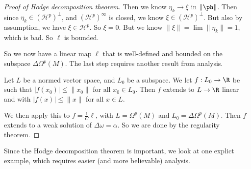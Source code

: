 \documentclass[a4paper]{article}
\begin{document}
\begin{proof}[Proof of Hodge decomposition theorem]
  Then we know $\eta_k\to \xi$ in $\| \ph\|$. Then since $\eta_k \in (\mathcal{H}^p)^\perp$, and $(\mathcal{H}^p)^\infty$ is closed, we know $\xi \in (\mathcal{H}^p)^\perp$. But also by assumption, we have $\xi \in \mathcal{H}^p$. So $\xi = 0$. But we know $\|\xi\| = \lim \|\eta_k\| = 1$, which is bad. So $\ell$ is bounded.

  So we now have a linear map $\ell$ that is well-defined and bounded on the subspace $\Delta \Omega^p(M)$. The last step requires another result from analysis.
  \begin{thm}
    Let $L$ be a normed vector space, and $L_0$ be a subspace. We let $f: L_0 \to \R$ be such that $|f(x_0)| \leq \|x_0\|$ for all $x_0 \in L_0$. Then $f$ extends to $L \to \R$ linear and with $|f(x)| \leq \|x\|$ for all $x \in L$.
  \end{thm}
  We then apply this to $f = \frac{1}{C}\ell$, with $L = \Omega^p(M)$ and $L_0 = \Delta \Omega^p(M)$. Then $f$ extends to a weak solution of $\Delta \omega = \alpha$. So we are done by the regularity theorem.
\end{proof}

Since the Hodge decomposition theorem is important, we look at one explict example, which requires easier (and more believable) analysis.
\end{document}
